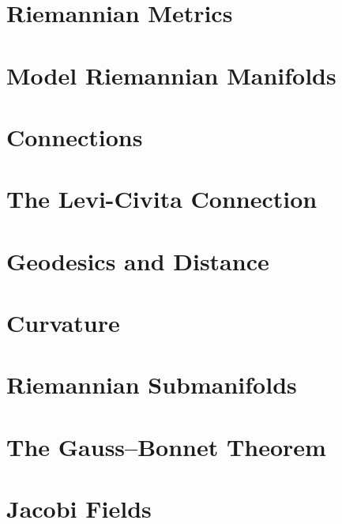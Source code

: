 \chapter{Riemannian Metrics}
\label{chap:riemannian-metrics}


\chapter{Model Riemannian Manifolds}
\label{chap:model-riemannian-manifolds}


\chapter{Connections}
\label{chap:connections}


\chapter{The Levi-Civita Connection}
\label{chap:levi-civita-connection}


\chapter{Geodesics and Distance}
\label{chap:geodesics-and-distance}


\chapter{Curvature}
\label{chap:curvature}


\chapter{Riemannian Submanifolds}
\label{chap:riemannian-submanifolds}


\chapter{The Gauss--Bonnet Theorem}
\label{chap:gauss-bonnet-theorem}


\chapter{Jacobi Fields}
\label{chap:jacobi-fields}


